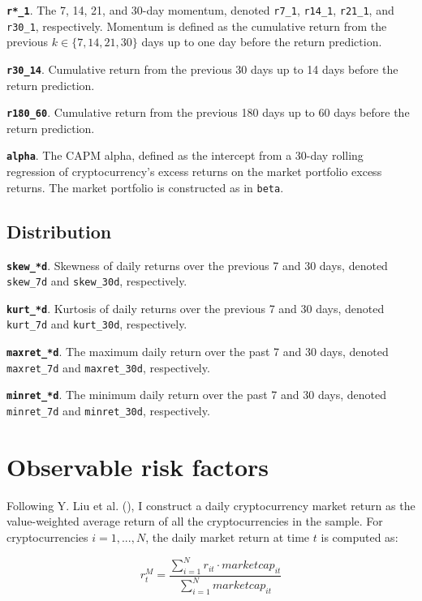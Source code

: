 \documentclass[
  12pt,
  a4paper,
  openany]{scrbook}
\begin{document}
\textbf{\texttt{r*\_1}}. The 7, 14, 21, and 30-day momentum, denoted
\texttt{r7\_1}, \texttt{r14\_1}, \texttt{r21\_1}, and \texttt{r30\_1},
respectively. Momentum is defined as the cumulative return from the
previous \(k \in \{7, 14, 21, 30\}\) days up to one day before the
return prediction.

\textbf{\texttt{r30\_14}}. Cumulative return from the previous 30 days
up to 14 days before the return prediction.

\textbf{\texttt{r180\_60}}. Cumulative return from the previous 180 days
up to 60 days before the return prediction.

\textbf{\texttt{alpha}}. The CAPM alpha, defined as the intercept from a
30-day rolling regression of cryptocurrency's excess returns on the
market portfolio excess returns. The market portfolio is constructed as
in \texttt{beta}.

\subsection{Distribution}\label{distribution}

\textbf{\texttt{skew\_*d}}. Skewness of daily returns over the previous
7 and 30 days, denoted \texttt{skew\_7d} and \texttt{skew\_30d},
respectively.

\textbf{\texttt{kurt\_*d}}. Kurtosis of daily returns over the previous
7 and 30 days, denoted \texttt{kurt\_7d} and \texttt{kurt\_30d},
respectively.

\textbf{\texttt{maxret\_*d}}. The maximum daily return over the past 7
and 30 days, denoted \texttt{maxret\_7d} and \texttt{maxret\_30d},
respectively.

\textbf{\texttt{minret\_*d}}. The minimum daily return over the past 7
and 30 days, denoted \texttt{minret\_7d} and \texttt{minret\_30d},
respectively.

\section{Observable risk factors}\label{sec-obs_factors}

Following Y. Liu et al. (), I
construct a daily cryptocurrency market return as the value-weighted
average return of all the cryptocurrencies in the sample. For
cryptocurrencies \(i = 1, ..., N\), the daily market return at time
\(t\) is computed as:

\[
r_t^M = \frac{\sum_{i=1}^N r_{it} \cdot marketcap_{it}}
             {\sum_{i=1}^N marketcap_{it} }
\]
\end{document}
